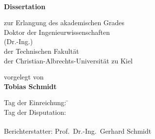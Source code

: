 \begin{titlepage}
   \centering
   \LARGE
   \vspace*{10mm}
   
   {
      \textbf{\tit{}}\\[0.5ex]
      \subtit{}
   }
   		
   \vspace{2cm}
   \textbf{Dissertation}

   \vspace{2ex}
   {\Large
      zur Erlangung des akademischen Grades \\[0.5ex]
      Doktor der Ingenieurwissenschaften \\[0.5ex]
      (Dr.-Ing.) \\[0.5ex]
      der Technischen Fakultät \\[0.5ex]
      der Christian-Albrechts-Universität zu Kiel \\[0.5ex]
   }

   \vspace{2.8cm}
   {
   	\Large
   	vorgelegt von 
   }\\[2ex]
   \textbf{
   	Tobias Schmidt
   }

   \vspace{2.5cm}
	\locdate
\end{titlepage}

\newpage

\thispagestyle{empty}
\quad
\vspace{25mm}

\vfill
\begin{tabbing}
   Tag der Einreichung: \hspace{16ex} \=  \\
   Tag der Disputation: \>  \\ \\
	Berichterstatter: \>  Prof.~Dr.-Ing.~Gerhard Schmidt \\
	 \>   \\
	 \>    \\
\end{tabbing}

 